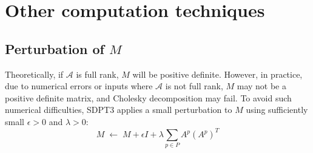 \section{Other computation techniques}

\subsection{Perturbation of \boldmath $M$ }

Theoretically, if $\mathcal{A}$ is full rank, $M$ will be positive definite.
However, in practice, due to numerical errors or inputs where $\mathcal{A}$ is not full rank, $M$ may not be a positive definite matrix, and Cholesky decomposition may fail.  
To avoid such numerical difficulties, SDPT3 applies a small perturbation to $M$ using sufficiently small $\epsilon > 0$ and $\lambda > 0$:
\[
  M \;\leftarrow\; M + \epsilon I + \lambda \sum_{p\in P} A^p (A^p)^T
\]

